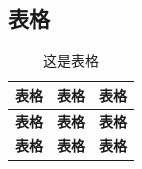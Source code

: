 \begin{ujnbody}
    \subsection{表格}

    \begin{table}[htbp]
        \centering
        \caption{这是表格}
        \begin{tabular}{|c|c|c|}
            \hline
            \multicolumn{1}{|c|}{\textbf{表格}} & \multicolumn{1}{c|}{\textbf{表格}} & \multicolumn{1}{c|}{\textbf{表格}} \\ \hline
            \multicolumn{1}{|c|}{\textbf{表格}} & \multicolumn{1}{c|}{\textbf{表格}} & \multicolumn{1}{c|}{\textbf{表格}} \\ \hline
            \multicolumn{1}{|c|}{\textbf{表格}} & \multicolumn{1}{c|}{\textbf{表格}} & \multicolumn{1}{c|}{\textbf{表格}} \\ \hline
        \end{tabular}
    \end{table}
\end{ujnbody}